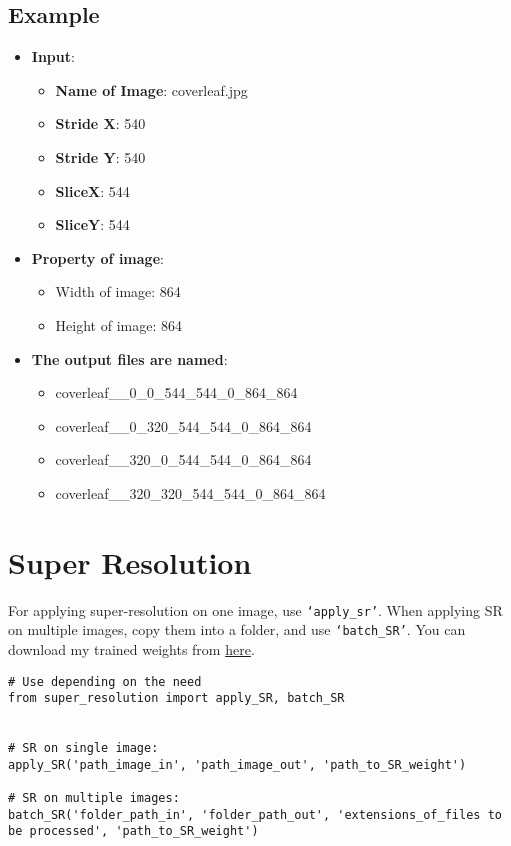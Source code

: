 \subsection*{Example}
\begin{itemize}[label={}]
  \item\textbf{Input}:
  \begin{itemize}[{\textbullet}]
    \setlength\itemsep{1mm}
    \item \textbf{Name of Image}: coverleaf.jpg
    \item \textbf{Stride X}: 540
    \item \textbf{Stride Y}: 540
    \item \textbf{SliceX}: 544
    \item \textbf{SliceY}: 544
  \end{itemize}

  \item\textbf{Property of image}:
  \begin{itemize}[{\textbullet}]
    \setlength\itemsep{1mm}
    \item Width of image: 864
    \item Height of image: 864
  \end{itemize}

  \item\textbf{The output files are named}:
  \begin{itemize}[>]
    \setlength\itemsep{1mm}
    \item coverleaf\_\_0\_0\_544\_544\_0\_864\_864
    \item coverleaf\_\_0\_320\_544\_544\_0\_864\_864
    \item coverleaf\_\_320\_0\_544\_544\_0\_864\_864
    \item coverleaf\_\_320\_320\_544\_544\_0\_864\_864
  \end{itemize}
\end{itemize}
\section{Super Resolution}
For applying super-resolution on one image, use \texttt{`apply\_sr'}. When applying SR on multiple images, copy them into a folder, and use \texttt{`batch\_SR'}. You can download my trained weights from \href{https://nautatva.github.io/btp/weight/sr/}{here}.

\begin{verbatim}
# Use depending on the need
from super_resolution import apply_SR, batch_SR


# SR on single image:
apply_SR('path_image_in', 'path_image_out', 'path_to_SR_weight')

# SR on multiple images:
batch_SR('folder_path_in', 'folder_path_out', 'extensions_of_files to be processed', 'path_to_SR_weight')
\end{verbatim}


